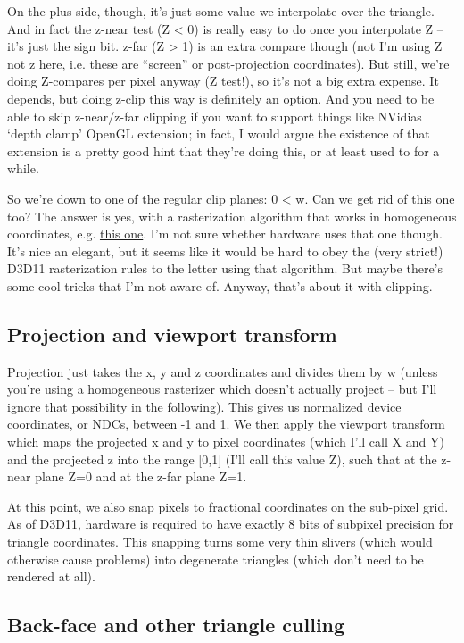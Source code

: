 \documentclass[12pt]{article}
\begin{document}
On the plus side, though, it’s just some value we interpolate over the triangle. And in fact the z-near test (Z < 0) is really easy to do once you interpolate Z – it’s just the sign bit. z-far (Z > 1) is an extra compare though (not I’m using Z not z here, i.e. these are “screen” or post-projection coordinates). But still, we’re doing Z-compares per pixel anyway (Z test!), so it’s not a big extra expense. It depends, but doing z-clip this way is definitely an option. And you need to be able to skip z-near/z-far clipping if you want to support things like NVidias ‘depth clamp’ OpenGL extension; in fact, I would argue the existence of that extension is a pretty good hint that they’re doing this, or at least used to for a while.

So we’re down to one of the regular clip planes: 0 < w. Can we get rid of this one too? The answer is yes, with a rasterization algorithm that works in homogeneous coordinates, e.g. \href{http://www.cs.unc.edu/\~olano/papers/2dh-tri/}{this one}. I’m not sure whether hardware uses that one though. It’s nice an elegant, but it seems like it would be hard to obey the (very strict!) D3D11 rasterization rules to the letter using that algorithm. But maybe there’s some cool tricks that I’m not aware of. Anyway, that’s about it with clipping.

\subsection{Projection and viewport transform}
\label{sec:orga01934d}

Projection just takes the x, y and z coordinates and divides them by w (unless you’re using a homogeneous rasterizer which doesn’t actually project – but I’ll ignore that possibility in the following). This gives us normalized device coordinates, or NDCs, between -1 and 1. We then apply the viewport transform which maps the projected x and y to pixel coordinates (which I’ll call X and Y) and the projected z into the range [0,1] (I’ll call this value Z), such that at the z-near plane Z=0 and at the z-far plane Z=1.

At this point, we also snap pixels to fractional coordinates on the sub-pixel grid. As of D3D11, hardware is required to have exactly 8 bits of subpixel precision for triangle coordinates. This snapping turns some very thin slivers (which would otherwise cause problems) into degenerate triangles (which don’t need to be rendered at all).

\subsection{Back-face and other triangle culling}
\label{sec:org9a70be0}
\end{document}
